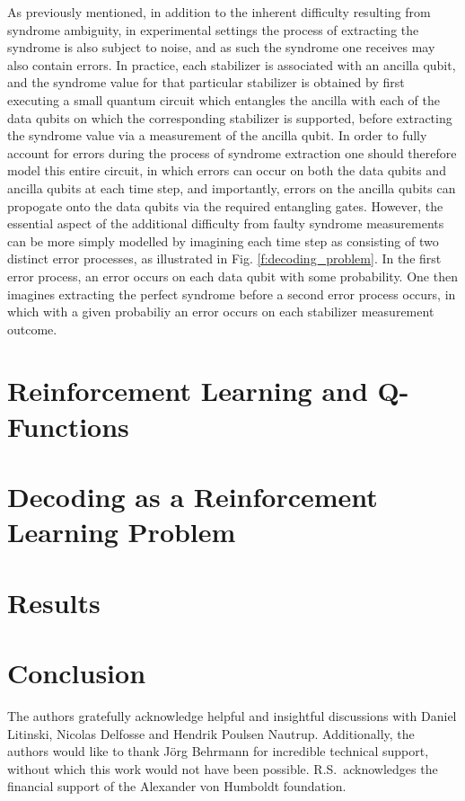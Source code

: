 \documentclass[onecolumn,preprintnumbers,amsmath,amssymb,notitlepage,nofootinbib,longbibliography,superscriptaddress,aps,pra,10pt]{revtex4-1}
\begin{document}
    As previously mentioned, in addition to the inherent difficulty resulting from syndrome ambiguity, in experimental settings the process of extracting the syndrome is also subject to noise, and as such the syndrome one receives may also contain errors. In practice, each stabilizer is associated with an ancilla qubit, and the syndrome value for that particular stabilizer is obtained by first executing a small quantum circuit which entangles the ancilla with each of the data qubits on which the corresponding stabilizer is supported, before extracting the syndrome value via a measurement of the ancilla qubit. In order to fully account for errors during the process of syndrome extraction one should therefore model this entire circuit, in which errors can occur on both the data qubits and ancilla qubits at each time step, and importantly, errors on the ancilla qubits can propogate onto the data qubits via the required entangling gates. However, the essential aspect of the additional difficulty from faulty syndrome measurements can be more simply modelled by imagining each time step as consisting of two distinct error processes, as illustrated in Fig. \ref{f:decoding_problem}. In the first error process, an error occurs on each data qubit with some probability. One then imagines extracting the perfect syndrome before a second error process occurs, in which with a given probabiliy an error occurs on each stabilizer measurement outcome.

   






\section{Reinforcement Learning and Q-Functions}\label{s:reinforcement_learning}
\section{Decoding as a Reinforcement Learning Problem}\label{s:decoding_as_rl}
\section{Results}\label{s:results}
\section{Conclusion}\label{s:conclusions}


\begin{acknowledgments}
The authors gratefully acknowledge helpful and insightful discussions with Daniel Litinski, Nicolas Delfosse and Hendrik Poulsen Nautrup. Additionally, the authors would like to thank J\"{o}rg Behrmann for incredible technical support, without which this work would not have been possible. R.S.\ acknowledges the financial support of the Alexander von Humboldt foundation.
\end{acknowledgments}


\end{document}
